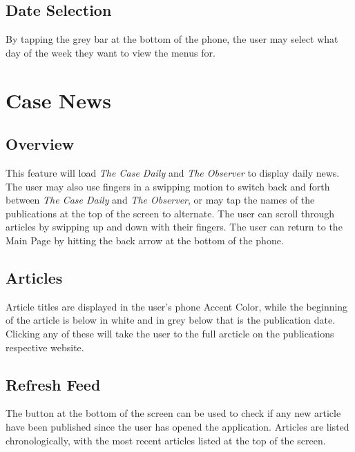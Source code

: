 \documentclass[pdftex,12pt,letter]{article}
\begin{document}
\subsection{Date Selection}
By tapping the grey bar at the bottom of the phone, the user may select what day of the week they want to view the menus for.

\section{Case News}
\subsection{Overview}
This feature will load  \emph{The Case Daily} and \emph{The Observer} to display daily news. The user may also use fingers in a swipping motion to switch back and forth between  \emph{The Case Daily} and \emph{The Observer}, or may tap the names of the publications at the top of the screen to alternate. The user can scroll through articles by swipping up and down with their fingers. The user can return to the Main Page by hitting the back arrow at the bottom of the phone. 
\subsection{Articles}
Article titles are displayed in the user's phone Accent Color, while the beginning of the article is below in white and in grey below that is the publication date. Clicking any of these will take the user to the full arcticle on the publications respective website.
\subsection{Refresh Feed}
The button at the bottom of the screen can be used to check if any new article have been published since the user has opened the application. Articles are listed chronologically, with the most recent articles listed at the top of the screen.
\end{document}
